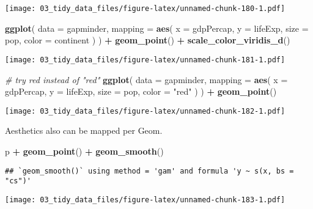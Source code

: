 \documentclass[
]{book}
\newenvironment{Shaded}{\begin{snugshade}}{\end{snugshade}}
\newcommand{\CommentTok}[1]{\textcolor[rgb]{0.56,0.35,0.01}{\textit{#1}}}
\newcommand{\DataTypeTok}[1]{\textcolor[rgb]{0.13,0.29,0.53}{#1}}
\newcommand{\KeywordTok}[1]{\textcolor[rgb]{0.13,0.29,0.53}{\textbf{#1}}}
\newcommand{\NormalTok}[1]{#1}
\newcommand{\OperatorTok}[1]{\textcolor[rgb]{0.81,0.36,0.00}{\textbf{#1}}}
\newcommand{\StringTok}[1]{\textcolor[rgb]{0.31,0.60,0.02}{#1}}
\begin{document}
\texttt{[image: 03\_tidy\_data\_files/figure-latex/unnamed-chunk-180-1.pdf]}

\begin{Shaded}
\begin{Highlighting}[]
\KeywordTok{ggplot}\NormalTok{(}
  \DataTypeTok{data =}\NormalTok{ gapminder,}
  \DataTypeTok{mapping =} \KeywordTok{aes}\NormalTok{(}
    \DataTypeTok{x =}\NormalTok{ gdpPercap, }\DataTypeTok{y =}\NormalTok{ lifeExp,}
    \DataTypeTok{size =}\NormalTok{ pop,}
    \DataTypeTok{color =}\NormalTok{ continent}
\NormalTok{  )}
\NormalTok{) }\OperatorTok{+}
\StringTok{  }\KeywordTok{geom\_point}\NormalTok{() }\OperatorTok{+}
\StringTok{  }\KeywordTok{scale\_color\_viridis\_d}\NormalTok{()}
\end{Highlighting}
\end{Shaded}

\texttt{[image: 03\_tidy\_data\_files/figure-latex/unnamed-chunk-181-1.pdf]}

\begin{Shaded}
\begin{Highlighting}[]
\CommentTok{\# try red instead of "red"}
\KeywordTok{ggplot}\NormalTok{(}
  \DataTypeTok{data =}\NormalTok{ gapminder,}
  \DataTypeTok{mapping =} \KeywordTok{aes}\NormalTok{(}
    \DataTypeTok{x =}\NormalTok{ gdpPercap, }\DataTypeTok{y =}\NormalTok{ lifeExp,}
    \DataTypeTok{size =}\NormalTok{ pop,}
    \DataTypeTok{color =} \StringTok{"red"}
\NormalTok{  )}
\NormalTok{) }\OperatorTok{+}
\StringTok{  }\KeywordTok{geom\_point}\NormalTok{()}
\end{Highlighting}
\end{Shaded}

\texttt{[image: 03\_tidy\_data\_files/figure-latex/unnamed-chunk-182-1.pdf]}

Aesthetics also can be mapped per Geom.

\begin{Shaded}
\begin{Highlighting}[]
\NormalTok{p }\OperatorTok{+}\StringTok{ }\KeywordTok{geom\_point}\NormalTok{() }\OperatorTok{+}
\StringTok{  }\KeywordTok{geom\_smooth}\NormalTok{()}
\end{Highlighting}
\end{Shaded}

\begin{verbatim}
## `geom_smooth()` using method = 'gam' and formula 'y ~ s(x, bs = "cs")'
\end{verbatim}

\texttt{[image: 03\_tidy\_data\_files/figure-latex/unnamed-chunk-183-1.pdf]}
\end{document}
